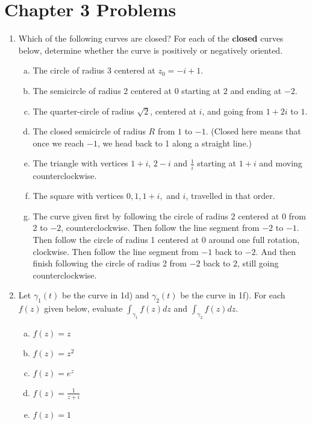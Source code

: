 \section*{Chapter 3 Problems}

\begin{enumerate}
\item Which of the following curves are closed? For each of the {\bf closed} curves below, determine whether the curve is positively or negatively oriented.

\begin{enumerate}[a)]
\item The circle of radius 3 centered at $z_0 = -i + 1$.
\item The semicircle of radius 2 centered at 0 starting at $2$ and ending at $-2$.
\item The quarter-circle of radius $\sqrt{2}$, centered at $i$, and going from $1 + 2i$ to $1$.
\item The closed semicircle of radius $R$ from $1$ to $-1$. (Closed here means that once we reach $-1$, we head back to 1 along a straight line.)
\item The triangle with vertices $1 + i$, $2-i$ and $\frac{1}{i}$ starting at $1 + i$ and moving counterclockwise.
\item The square with vertices $0,1,1+i,$ and $i$, travelled in that order.

\item The curve given first by following the circle of radius $2$ centered at $0$ from $2$ to $-2$, counterclockwise. Then follow the line segment from $-2$ to $-1$. Then follow the circle of radius 1 centered at $0$ around one full rotation, clockwise. Then follow the line segment from $-1$ back to $-2$. And then finish following the circle of radius 2 from $-2$ back to $2$, still going counterclockwise.
\end{enumerate}



\item Let $\gamma_1(t)$ be the curve in 1d) and $\gamma_2(t)$ be the curve in 1f). For each $f(z)$ given below, evaluate $\int_{\gamma_1} f(z)dz$ and $\int_{\gamma_2}f(z)dz$.

\begin{enumerate}[a)]
\item $f(z) = z$
\item $f(z) = z^2$
\item $f(z) = e^z$
\item $f(z) = \frac{1}{z + i}$
\item $f(z) = 1$
\end{enumerate}


\end{enumerate}
